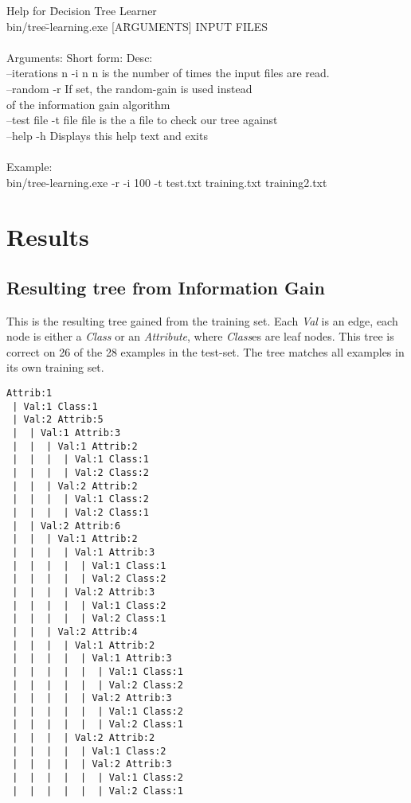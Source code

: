 \documentclass[english,a4paper]{scrartcl}
\begin{document}
\begin{ttfamily}
\begin{tabbing}
Help for \=Decision Tree Learner\\
\>bin/tree\=-learning.exe [A\=RGUMENTS] {INPUT FILES}\\
\\
Arguments:	\>\>Short form:	\>Desc:\\
--iterations n	\>\>-i n		\>n is the number of times the input files are read.\\
--random	\>\>-r		\>If set, the random-gain is used instead\\\>\>\> of the
information gain algorithm\\
--test file	\>\>-t file		\>file is the a file to check our tree against\\

--help	\>\>-h		\>Displays this help text and exits\\
\\
Example:\\
\>bin/tree-learning.exe -r -i 100 -t test.txt training.txt
training2.txt\\ 
\end{tabbing}
\end{ttfamily}
 
\newpage
\section{Results}
\subsection{Resulting tree from Information Gain}
This is the resulting tree gained from the training set. Each \emph{Val} is an
edge, each node is either a \emph{Class} or an \emph{Attribute}, where 
\emph{Class}es are leaf nodes. This tree is correct on 26 of the 28 examples
in the test-set. The tree matches all examples in its own training set.
\begin{lstlisting}
Attrib:1
 | Val:1 Class:1
 | Val:2 Attrib:5
 |  | Val:1 Attrib:3
 |  |  | Val:1 Attrib:2
 |  |  |  | Val:1 Class:1
 |  |  |  | Val:2 Class:2
 |  |  | Val:2 Attrib:2
 |  |  |  | Val:1 Class:2
 |  |  |  | Val:2 Class:1
 |  | Val:2 Attrib:6
 |  |  | Val:1 Attrib:2
 |  |  |  | Val:1 Attrib:3
 |  |  |  |  | Val:1 Class:1
 |  |  |  |  | Val:2 Class:2
 |  |  |  | Val:2 Attrib:3
 |  |  |  |  | Val:1 Class:2
 |  |  |  |  | Val:2 Class:1
 |  |  | Val:2 Attrib:4
 |  |  |  | Val:1 Attrib:2
 |  |  |  |  | Val:1 Attrib:3
 |  |  |  |  |  | Val:1 Class:1
 |  |  |  |  |  | Val:2 Class:2
 |  |  |  |  | Val:2 Attrib:3
 |  |  |  |  |  | Val:1 Class:2
 |  |  |  |  |  | Val:2 Class:1
 |  |  |  | Val:2 Attrib:2
 |  |  |  |  | Val:1 Class:2
 |  |  |  |  | Val:2 Attrib:3
 |  |  |  |  |  | Val:1 Class:2
 |  |  |  |  |  | Val:2 Class:1

\end{lstlisting}
\newpage
\end{document}
